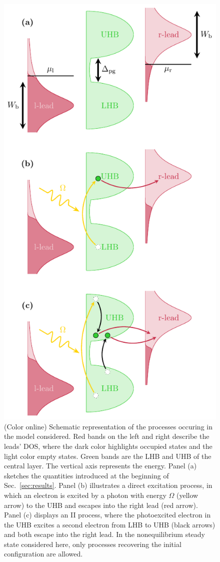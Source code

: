 \documentclass[aps,prb,groupedaddress,showpacs,twocolumn,superscriptaddress,10pt]{revtex4-2}
\begin{document}
\begin{figure}[t]    

\includegraphics[width=0.85\linewidth]{./figures_Paper1/energy_setup.pdf}
\caption{(Color online) Schematic representation of the processes occuring in the model considered. Red bands on the left and right describe the leads' DOS, where the dark color highlights occupied states and the light color empty states. Green bands are the LHB and UHB of the central layer. The vertical axis represents the energy. Panel (a) sketches the quantities introduced at the beginning of Sec.~\ref{sec:results}. Panel (b) illustrates a direct excitation process, in which an electron is excited by a photon with energy $\Omega$ (yellow arrow) to the UHB and escapes into the right lead (red arrow). Panel (c) displays an II process, where the photoexcited electron in the UHB excites a second electron from LHB to UHB (black arrows) and both escape into the right lead. In the nonequilibrium steady state considered here, only processes recovering the initial configuration are allowed.} 
\label{fig:energy_setup}
\end{figure}
  
\end{document}
